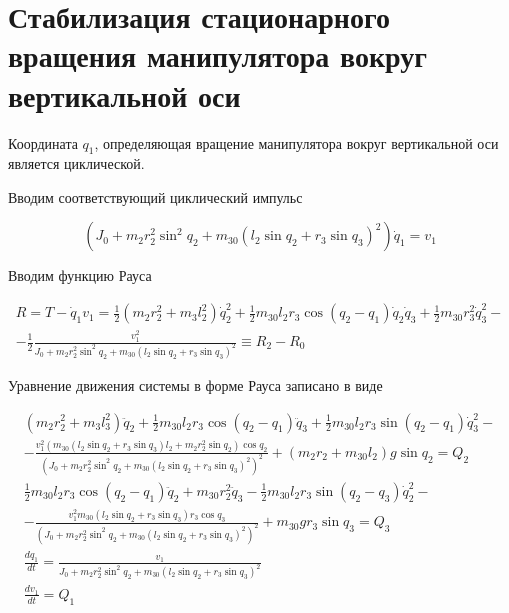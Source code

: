   \section{Стабилизация стационарного вращения манипулятора вокруг вертикальной оси}%
  
  Координата $q_1$, определяющая вращение манипулятора вокруг вертикальной оси является циклической.
  
  Вводим соответствующий циклический импульс
  
  \begin{equation*}
  (J_0 + m_2 r_2^2 \sin^2 q_2 + m_{30} (l_2 \sin q_2 + r_3 \sin q_3)^2) \dot q_1 = v_1
  \end{equation*} 
  
  Вводим функцию Рауса
  
  \begin{equation*}
  \begin{array}{c}
  \displaystyle R = T - \dot q_1 v_1 = \frac12 (m_2 r_2^2 + m_3 l_2^2) \dot q_2^2
  + \frac12 m_{30} l_2 r_3 \cos(q_2 - q_1) \dot q_2 \dot q_3 + \frac12 m_{30} r_3^2 \dot q_3^2 - \\ \displaystyle - \frac12 \frac{v_1^2}{J_0 + m_2 r_2^2 \sin^2 q_2 + m_{30} (l_2 \sin q_2 + r_3 \sin q_3)^2} \equiv R_2 - R_0
  \end{array}
  \end{equation*}
  
  Уравнение движения системы в форме Рауса записано в виде
  
  \begin{equation*}
  \begin{array}{l}
  \displaystyle (m_2 r_2^2 + m_3 l_3^2) \ddot q_2 + \frac12 m_{30} l_2 r_3 \cos(q_2 - q_1) \ddot q_3 + \frac12 m_{30} l_2 r_3 \sin(q_2 - q_1) \dot q_3^2 - \\ 
  \displaystyle - \frac{v_1^2 (m_{30} (l_2 \sin q_2 + r_3 \sin q_3) l_2 + m_2 r_2^2 \sin q_2) \cos q_2}{(J_0 + m_2 r_2^2 \sin^2 q_2 + m_{30} (l_2 \sin q_2 + r_3 \sin q_3)^2)^2} + (m_2 r_2 + m_{30} l_2) g \sin q_2 = Q_2 \\
  \displaystyle \frac12 m_{30} l_2 r_3 \cos (q_2 - q_1) \ddot q_2 + m_{30} r_2^2 \ddot q_3 - \frac12 m_{30} l_2 r_3 \sin(q_2 - q_3) \dot q_2^2 - \\ 
  \displaystyle - \frac{v_1^2 m_{30} (l_2 \sin q_2 + r_3 \sin q_3) r_3 \cos q_3}{(J_0 + m_2 r_2^2 \sin^2 q_2 + m_{30} (l_2 \sin q_2 + r_3 \sin q_3)^2)^2} + m_{30} g r_3 \sin q_3 = Q_3 \\
  \displaystyle \frac{d q_1}{d t} = \frac{v_1}{J_0 + m_2 r_2^2 \sin^2 q_2 + m_{30} (l_2 \sin q_2 + r_3 \sin q_3)^2} \\
  \displaystyle \frac{d v_1}{d t} = Q_1
  \end{array}
  \end{equation*}
  
